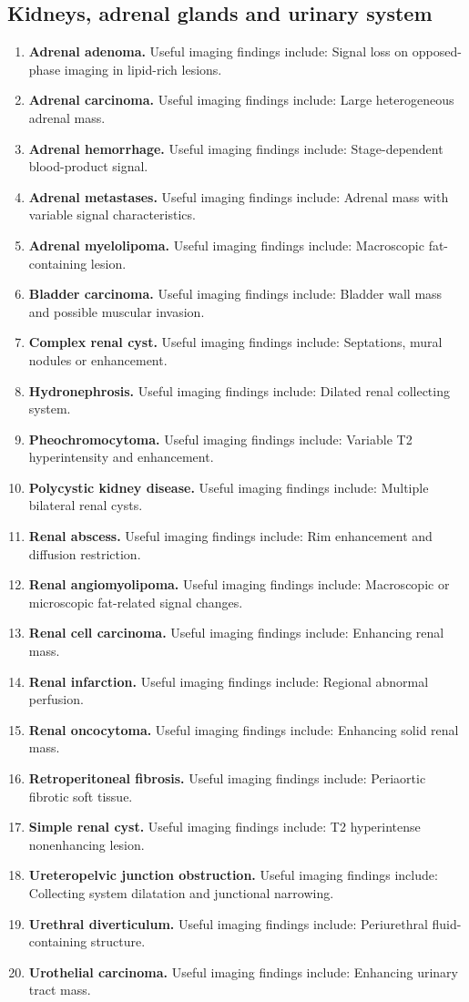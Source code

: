 \subsection{Kidneys, adrenal glands and urinary system}
\begin{enumerate}[leftmargin=*,itemsep=0.45em,topsep=0.4em]
\item \textbf{Adrenal adenoma.} Useful imaging findings include: Signal loss on opposed-phase imaging in lipid-rich lesions.
\item \textbf{Adrenal carcinoma.} Useful imaging findings include: Large heterogeneous adrenal mass.
\item \textbf{Adrenal hemorrhage.} Useful imaging findings include: Stage-dependent blood-product signal.
\item \textbf{Adrenal metastases.} Useful imaging findings include: Adrenal mass with variable signal characteristics.
\item \textbf{Adrenal myelolipoma.} Useful imaging findings include: Macroscopic fat-containing lesion.
\item \textbf{Bladder carcinoma.} Useful imaging findings include: Bladder wall mass and possible muscular invasion.
\item \textbf{Complex renal cyst.} Useful imaging findings include: Septations, mural nodules or enhancement.
\item \textbf{Hydronephrosis.} Useful imaging findings include: Dilated renal collecting system.
\item \textbf{Pheochromocytoma.} Useful imaging findings include: Variable T2 hyperintensity and enhancement.
\item \textbf{Polycystic kidney disease.} Useful imaging findings include: Multiple bilateral renal cysts.
\item \textbf{Renal abscess.} Useful imaging findings include: Rim enhancement and diffusion restriction.
\item \textbf{Renal angiomyolipoma.} Useful imaging findings include: Macroscopic or microscopic fat-related signal changes.
\item \textbf{Renal cell carcinoma.} Useful imaging findings include: Enhancing renal mass.
\item \textbf{Renal infarction.} Useful imaging findings include: Regional abnormal perfusion.
\item \textbf{Renal oncocytoma.} Useful imaging findings include: Enhancing solid renal mass.
\item \textbf{Retroperitoneal fibrosis.} Useful imaging findings include: Periaortic fibrotic soft tissue.
\item \textbf{Simple renal cyst.} Useful imaging findings include: T2 hyperintense nonenhancing lesion.
\item \textbf{Ureteropelvic junction obstruction.} Useful imaging findings include: Collecting system dilatation and junctional narrowing.
\item \textbf{Urethral diverticulum.} Useful imaging findings include: Periurethral fluid-containing structure.
\item \textbf{Urothelial carcinoma.} Useful imaging findings include: Enhancing urinary tract mass.
\end{enumerate}

